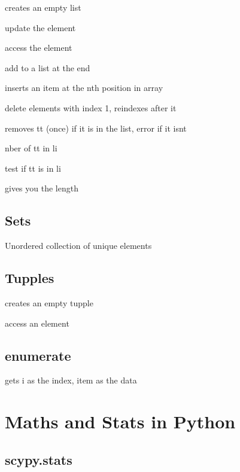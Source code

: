 		 creates an empty list


		 update the element

		 access the element

		  add to a list at the end

		 inserts an item at the nth position in array

		 delete elements with index 1, reindexes after it

		 removes tt (once) if it is in the list, error if it isnt

		 nber of tt in li

		 test if tt is in li

		 gives you the length


	\subsection{Sets}

		Unordered collection of unique elements



	\subsection{Tupples}
		
		 creates an empty tupple


		 access an element


	\subsection{enumerate}

		 gets i as the index, item as the data





\section{Maths and Stats in Python}

	\subsection{scypy.stats}

